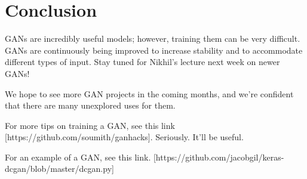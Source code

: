 \documentclass{article}
\begin{document}
    
\section{Conclusion}
    GANs are incredibly useful models; however, training them can be very difficult. GANs are continuously being improved to increase stability and to accommodate different types of input. Stay tuned for Nikhil's lecture next week on newer GANs!
    
    We hope to see more GAN projects in the coming months, and we're confident that there are many unexplored uses for them. 
    
    For more tips on training a GAN, see this link [https://github.com/soumith/ganhacks]. Seriously. It'll be useful.
    
    For an example of a GAN, see this link. [https://github.com/jacobgil/keras-dcgan/blob/master/dcgan.py]\\
    
\end{document}
